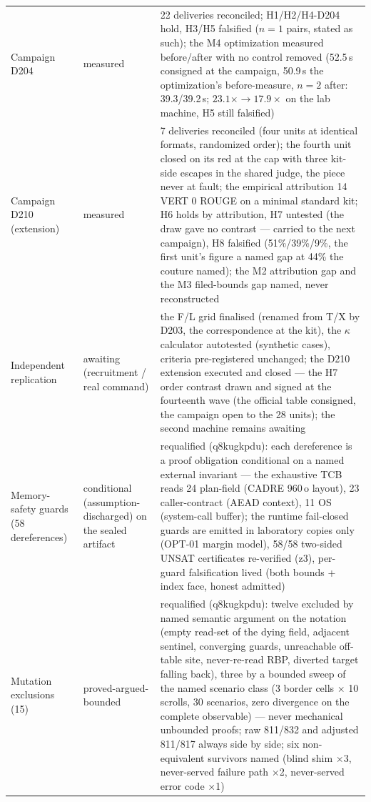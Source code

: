 \begin{longtable}{@{}p{3.4cm} p{2.9cm} p{8.4cm}@{}}
Campaign D204 & measured & 22 deliveries reconciled; H1/H2/H4-D204 hold, H3/H5 falsified ($n{=}1$ pairs, stated as such); the M4 optimization measured before/after with no control removed (52.5\,s consigned at the campaign, 50.9\,s the optimization's before-measure, $n{=}2$ after: 39.3/39.2\,s; $23.1\times \to 17.9\times$ on the lab machine, H5 still falsified) \\
Campaign D210 (extension) & measured & 7 deliveries reconciled (four units at identical formats, randomized order); the fourth unit closed on its red at the cap with three kit-side escapes in the shared judge, the piece never at fault; the empirical attribution 14 VERT 0 ROUGE on a minimal standard kit; H6 holds by attribution, H7 untested (the draw gave no contrast --- carried to the next campaign), H8 falsified (51\%/39\%/9\%, the first unit's figure a named gap at 44\% the couture named); the M2 attribution gap and the M3 filed-bounds gap named, never reconstructed \\
Independent replication & awaiting (recruitment / real command) & the F/L grid finalised (renamed from T/X by D203, the correspondence at the kit), the $\kappa$ calculator autotested (synthetic cases), criteria pre-registered unchanged; the D210 extension executed and closed --- the H7 order contrast drawn and signed at the fourteenth wave (the official table consigned, the campaign open to the 28 units); the second machine remains awaiting \\
Memory-safety guards (58 dereferences) & conditional (assumption-discharged) on the sealed artifact & requalified (q8kugkpdu): each dereference is a proof obligation conditional on a named external invariant --- the exhaustive TCB reads 24 plan-field (CADRE 960\,o layout), 23 caller-contract (AEAD context), 11 OS (system-call buffer); the runtime fail-closed guards are emitted in laboratory copies only (OPT-01 margin model), 58/58 two-sided UNSAT certificates re-verified (z3), per-guard falsification lived (both bounds + index face, honest admitted) \\
Mutation exclusions (15) & proved-argued-bounded & requalified (q8kugkpdu): twelve excluded by named semantic argument on the notation (empty read-set of the dying field, adjacent sentinel, converging guards, unreachable off-table site, never-re-read RBP, diverted target falling back), three by a bounded sweep of the named scenario class (3 border cells $\times$ 10 scrolls, 30 scenarios, zero divergence on the complete observable) --- never mechanical unbounded proofs; raw 811/832 and adjusted 811/817 always side by side; six non-equivalent survivors named (blind shim $\times$3, never-served failure path $\times$2, never-served error code $\times$1) \\

\end{longtable}
